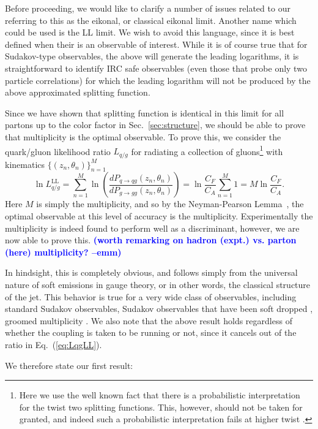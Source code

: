 \documentclass[letterpaper,11pt]{article}
\DeclareRobustCommand{\Sec}[1]{Sec.~\ref{#1}}
\DeclareRobustCommand{\Eq}[1]{Eq.~(\ref{#1})}
\newcommand{\emm}[1]{\marginpar{\raggedright\scriptsize\textbf{\textcolor{blue}{emm}}}  \textbf{\textcolor{blue}{(#1 --emm)}}}
\begin{document}
Before proceeding, we would like to clarify a number of issues related to our referring to this as the eikonal, or classical eikonal limit.
%
Another name which could be used is the LL limit.
%
We wish to avoid this language, since it is best defined when their is an observable of interest.
% 
While it is of course true that for Sudakov-type observables, the above will generate the leading logarithms, it is straightforward to identify IRC safe observables (even those that probe only two particle correlations) for which the leading logarithm will not be produced by the above approximated splitting function. 

Since we have shown that splitting function is identical in this limit for all partons up to the color factor in \Sec{sec:structure}, we should be able to prove that multiplicity is the optimal observable.
%
To prove this, we consider the quark/gluon likelihood ratio $L_{q/g}$ for radiating a collection of gluons\footnote{Here we use the well known fact that there is a probabilistic interpretation for the twist two splitting functions. This, however, should not be taken for granted, and indeed such a probabilistic interpretation fails at higher twist \cite{Jaffe:1982pm}.} with kinematics $\{(z_n,\theta_n)\}_{n=1}^M$ 
\begin{equation}\label{eq:LqgLL}
\ln L_{q/g}^\text{LL} = \sum_{n=1}^M \ln \left(\frac{dP_{q\to qg}(z_n,\theta_n)}{dP_{g\to gg}(z_n,\theta_n)} \right)= \ln \frac{C_F}{C_A} \sum_{n=1}^M 1 = M \ln \frac{C_F}{C_A}.
\end{equation}
Here $M$ is simply the multiplicity, and so by the Neyman-Pearson Lemma~\cite{neyman1933ix}, the optimal observable at this level of accuracy is the multiplicity.
%
Experimentally the multiplicity is indeed found to perform well as a discriminant, however, we are now able to prove this.
\emm{worth remarking on hadron (expt.) vs. parton (here) multiplicity?}


In hindsight, this is completely obvious, and follows simply from the universal nature of soft emissions in gauge theory, or in other words, the classical structure of the jet.
%
This behavior is true for a very wide class of observables, including standard Sudakov observables, Sudakov observables that have been soft dropped \cite{Larkoski:2014wba}, groomed multiplicity \cite{Frye:2017yrw}.
%
We also note that the above result holds regardless of whether the coupling is taken to be running or not, since it cancels out of the ratio in \Eq{eq:LqgLL}. 


We therefore state our first result:
\end{document}
